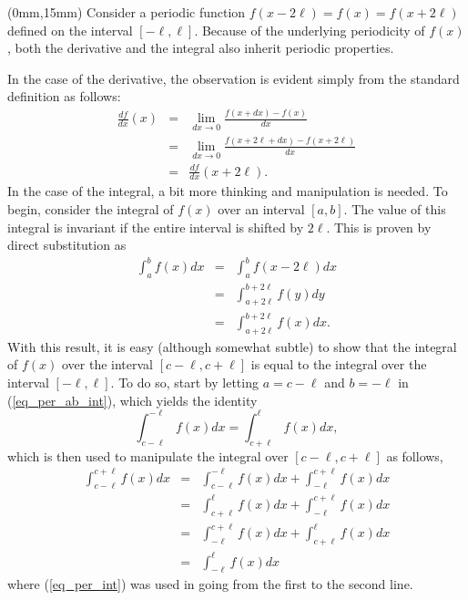 \begin{textblock*}{90mm}(0mm,15mm)
Consider a periodic function $f(x-2\ell) = f(x) = f(x + 2\ell)$ defined on the interval $[-\ell,\ell]$.  
Because of the underlying periodicity of $f(x)$, both the derivative and the integral also inherit 
periodic properties.

In the case of the derivative, the observation is evident simply from 
the standard definition as follows:
\begin{eqnarray*}
  \frac{d f}{d x}(x) & = & \lim_{dx \rightarrow 0} \frac{ f(x+dx)-f(x)}{dx}\\
                     & = & \lim_{dx \rightarrow 0} \frac{ f(x + 2\ell + dx) - f(x + 2\ell) }{dx} \\
                     & = & \frac{d f}{d x}(x + 2\ell).
\end{eqnarray*}
In the case of the integral, a bit more thinking and manipulation is needed.
To begin, consider the integral of $f(x)$ over an interval $[a,b]$.  The value of this integral 
is invariant if the entire interval is shifted by $2 \ell$.  This is proven by direct substitution
as 
\begin{eqnarray}\label{eq_per_ab_int}
  \int_{a}^{b} f(x) dx & = & \int_{a}      ^{b}       f(x - 2\ell) dx            \\
                       & = & \int_{a+2\ell}^{b+2\ell} f(y)         dy  \nonumber \\
                       & = & \int_{a+2\ell}^{b+2\ell} f(x)         dx. \nonumber
\end{eqnarray}
With this result, it is easy (although somewhat subtle) to show that the integral
of $f(x)$ over the interval $[c-\ell,c+\ell]$ is equal to the integral over 
the interval $[-\ell,\ell]$.  To do so, start by letting $a = c - \ell$ and $b = -\ell$
in (\ref{eq_per_ab_int}), which yields the identity 
\begin{equation}\label{eq_per_int}
  \int_{c-\ell}^{-\ell} f(x) dx  =  \int_{c+\ell}^{\ell} f(x) dx,
\end{equation}
which is then used to manipulate the integral over $[c-\ell,c+\ell]$ as follows,
\begin{eqnarray} 
  \int_{c-\ell}^{c+\ell} f(x) dx  & = &  \int_{c-\ell}^{-\ell} f(x) dx + \int_{-\ell}^{c+\ell} f(x) dx \\
                                  & = &  \int_{c+\ell}^{\ell}  f(x) dx + \int_{-\ell}^{c+\ell} f(x) dx \nonumber \\
                                  & = &  \int_{-\ell}^{c+\ell} f(x) dx + \int_{c+\ell}^{\ell}  f(x) dx \nonumber \\
                                  & = &  \int_{-\ell}^{\ell}   f(x) dx                                 \nonumber
\end{eqnarray}
where (\ref{eq_per_int}) was used in going from the first to the second line.
\end{textblock*}



